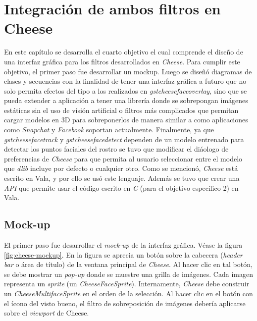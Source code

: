 \documentclass[a4paper,openright,12pt]{report}
\begin{document}
\chapter{Integración de ambos filtros en Cheese}
En este capítulo se desarrolla el cuarto objetivo el cual comprende el diseño
de una interfaz gráfica para los filtros desarrollados en \textit{Cheese}. Para
cumplir este objetivo, el primer paso fue desarrollar un mockup. Luego se diseñó
diagramas de clases y secuencias con la finalidad de tener una interfaz gráfica
a futuro que no solo permita efectos del tipo a los realizados en
\textit{gstcheesefaceoverlay}, sino que se pueda extender a aplicación a tener
una librería donde se sobrepongan imágenes estáticas sin el uso de visión
artificial o filtros más complicados que permitan cargar modelos en 3D para
sobreponerlos de manera similar a como aplicaciones como \textit{Snapchat} y
\textit{Facebook} soportan actualmente. Finalmente, ya que
\textit{gstcheesefacetrack} y \textit{gstcheesefacedetect} dependen de un
modelo entrenado para detectar los puntos faciales del rostro se tuvo que
modificar el diáologo de preferencias de \textit{Cheese} para que permita
al usuario seleccionar entre el modelo que \textit{dlib} incluye por defecto o
cualquier otro. Como se mencionó, \textit{Cheese} está escrito en Vala, y por
ello se usó este lenguaje. Además se tuvo que crear una \textit{API} que
permite usar el código escrito en \textit{C} (para el objetivo específico 2) en
Vala.

\section{Mock-up}
El primer paso fue desarrollar el \textit{mock-up} de la interfaz gráfica. Véase
la figura \ref{fig:cheese-mockup}. En la figura se aprecia un botón sobre la
cabecera (\textit{header bar} o área de título) de la ventana principal de
\textit{Cheese}. Al hacer clic en tal botón, se debe mostrar un \textit{pop-up}
donde se muestre una grilla de imágenes. Cada imagen representa un
\textit{sprite} (un \textit{CheeseFaceSprite}). Internamente, \textit{Cheese}
debe construir un \textit{CheeseMultifaceSprite} en el orden de la selección. Al
hacer clic en el botón con el ícono del visto bueno, el filtro de sobreposición
de imágenes debería aplicarse sobre el \textit{viewport} de Cheese.\\
\end{document}
